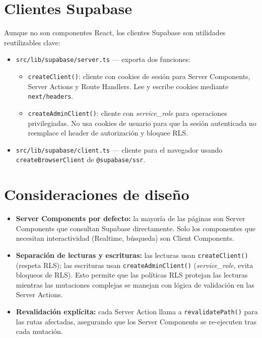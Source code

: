 \documentclass[12pt,a4paper,oneside]{report}
\newcommand{\file}[1]{\texttt{\color{cecyteDark}#1}}
\newcommand{\pkg}[1]{\texttt{#1}}
\begin{document}
\section{Clientes Supabase}

Aunque no son componentes React, los clientes Supabase son utilidades reutilizables clave:

\begin{itemize}
  \item \file{src/lib/supabase/server.ts} — exporta dos funciones:
    \begin{itemize}
      \item \file{createClient()}: cliente con cookies de sesión para Server Components, Server Actions y Route Handlers. Lee y escribe cookies mediante \pkg{next/headers}.
      \item \file{createAdminClient()}: cliente con \textit{service\_role} para operaciones privilegiadas. No usa cookies de usuario para que la sesión autenticada no reemplace el header de autorización y bloquee RLS.
    \end{itemize}
  \item \file{src/lib/supabase/client.ts} — cliente para el navegador usando \file{createBrowserClient} de \pkg{@supabase/ssr}.
\end{itemize}

\section{Consideraciones de diseño}

\begin{itemize}
  \item \textbf{Server Components por defecto:} la mayoría de las páginas son Server Components que consultan Supabase directamente. Solo los componentes que necesitan interactividad (Realtime, búsqueda) son Client Components.
  \item \textbf{Separación de lecturas y escrituras:} las lecturas usan \file{createClient()} (respeta RLS); las escrituras usan \file{createAdminClient()} (\textit{service\_role}, evita bloqueos de RLS). Esto permite que las políticas RLS protejan las lecturas mientras las mutaciones complejas se manejan con lógica de validación en las Server Actions.
  \item \textbf{Revalidación explícita:} cada Server Action llama a \file{revalidatePath()} para las rutas afectadas, asegurando que los Server Components se re-ejecuten tras cada mutación.
\end{itemize}
\end{document}
